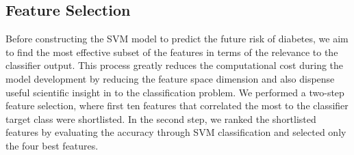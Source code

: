 \documentclass[journal,comsoc]{IEEEtran}
\renewcommand{\^}{\hat}  %
\begin{document}
\subsection{Feature Selection}
%
Before constructing the SVM model to predict the future risk of diabetes, we aim to find the most effective subset of the features in terms of the relevance to the classifier output. This process greatly reduces the computational cost during the model development by reducing the feature space dimension and also dispense useful scientific insight in to the classification problem. We performed a two-step feature selection, where first ten features that correlated the most to the classifier target class were shortlisted. In the second step, we ranked the shortlisted features by evaluating the accuracy through SVM classification and selected only the four best features.
\end{document}
